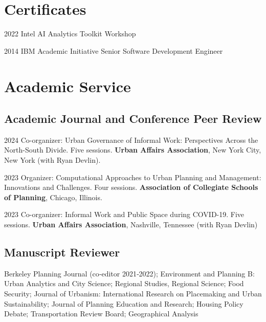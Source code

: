 \documentclass[12pt,letterpaper]{report}
\newcommand{\listitemspace}{0.25em}
\renewenvironment{itemize}
{\begin{list}{}{\setlength{\leftmargin}{0em}
                \setlength{\parskip}{0em}
                \setlength{\itemsep}{\listitemspace}
                \setlength{\parsep}{\listitemspace}}}
{\end{list}}
\begin{document}
    \section*{Certificates}
    \begin{tablist}
        \item[2022] \tab{}Intel AI Analytics Toolkit Workshop
        \item[2014] \tab{}IBM Academic Initiative Senior Software Development Engineer
    \end{tablist}

    \section*{Academic Service}
    \subsection*{Academic Journal and Conference Peer Review}
    \begin{tablist}
        \item[2024] \tab{}Co-organizer: Urban Governance of Informal Work: Perspectives Across the North-South Divide. Five sessions. \textbf{Urban Affairs Association}, New York City, New York (with Ryan Devlin).
        \item[2023] \tab{}Organizer: Computational Approaches to Urban Planning and Management: Innovations and Challenges. Four sessions.  \textbf{Association of Collegiate Schools of Planning}, Chicago, Illinois.
        \item[2023] \tab{}Co-organizer: Informal Work and Public Space during COVID-19. Five sessions. \textbf{Urban Affairs Association}, Nashville, Tennessee (with Ryan Devlin)
    \end{tablist}

    \subsection*{Manuscript Reviewer}
    \begin{itemize}
    Berkeley Planning Journal (co‑editor 2021‑2022); Environment and Planning B: Urban Analytics and City Science; Regional Studies, Regional Science; Food Security; Journal of Urbanism: International Research on Placemaking and Urban Sustainability; Journal of Planning Education and Research; Housing Policy Debate; Transportation Review Board; Geographical Analysis
    \end{itemize}
\end{document}
